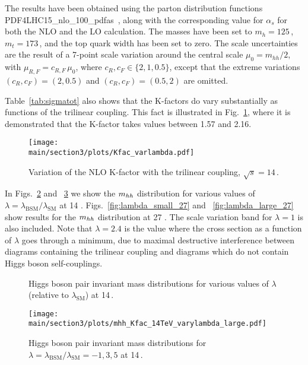 The results have been obtained using the parton distribution functions PDF4LHC15\_nlo\_100\_pdfas~\cite{Butterworth:2015oua,CT14,MMHT14,Ball:2014uwa},
along with the corresponding value for $\alpha_s$ for both the NLO and
the LO calculation.
The masses have been set to $m_h=125$\,\UGeV, $m_t=173$\,\UGeV,
and the top quark width has been set to zero. 
The scale uncertainties are the result of a 7-point scale variation around the central scale $\mu_0 = m_{hh}/2$,
with $\mu_{R,F}=c_{R,F}\,\mu_0$, where 
$c_R,c_F\in \{2,1,0.5\}$, except that the extreme variations $(c_R,c_F)=(2,0.5)$ and $(c_R,c_F)=(0.5,2)$
are omitted. 

Table~\ref{tab:sigmatot} also shows that the K-factors do vary substantially as functions of the trilinear coupling.
This fact is illustrated in Fig.~\ref{fig:Kfacvariation}, where it is demonstrated that the K-factor takes values between 1.57 and 2.16.

\begin{figure}[htb]
  \centering
    \texttt{[image: \\main/section3/plots/Kfac\_varlambda.pdf]}
\caption{Variation of the NLO K-factor with the trilinear coupling, $\sqrt{s}=14$\,\UTeV.}
\label{fig:Kfacvariation}
\end{figure}



In Figs.~\ref{fig:lambda_small} and ~\ref{fig:lambda_large} we show the $m_{hh}$ distribution for various values of $\lambda=\lambda_{\mathrm{BSM}}/\lambda_{\mathrm{SM}}$ at 14 \UTeV.
Figs.~\ref{fig:lambda_small_27} and ~\ref{fig:lambda_large_27} 
 show results for the $m_{hh}$ distribution at 27 \UTeV. The scale variation band for $\lambda=1$ is also included.
 Note that $\lambda=2.4$ is the value where the cross section as a function of $\lambda$ goes through a minimum, due to maximal destructive interference between diagrams containing the trilinear coupling and diagrams which do not contain Higgs boson self-couplings.
 
\begin{figure}[htb]
  \centering
 \caption{Higgs boson pair invariant mass distributions for various values of $\lambda$ (relative to $\lambda_{\mathrm{SM}}$)  at 14\,\UTeV.}
\label{fig:lambda_small}
\end{figure}
%
\begin{figure}[htb]
  \centering
    \texttt{[image: \\main/section3/plots/mhh\_Kfac\_14TeV\_varylambda\_large.pdf]}
\caption{Higgs boson pair invariant mass distributions for $\lambda=\lambda_{\mathrm{BSM}}/\lambda_{\mathrm{SM}}=-1,3,5$  at 14\,\UTeV.}
\label{fig:lambda_large}
\end{figure}

